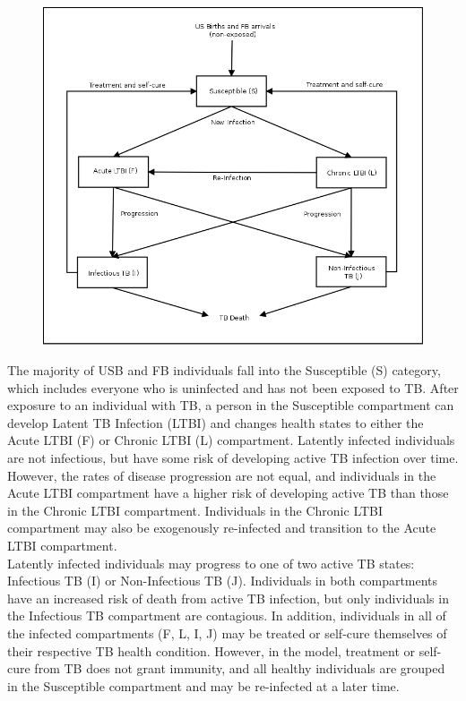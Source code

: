 \documentclass{amsart}
\begin{document}
\begin{figure}
\includegraphics[scale=0.25]{figures/HillModelFlowChart.png}
\end{figure}

The majority of USB and FB individuals fall into the Susceptible (S) category, which includes everyone
who is uninfected and has not been exposed to TB.  After exposure to an individual
with TB, a person in the Susceptible compartment can develop Latent TB Infection (LTBI) and changes
health states to either the Acute LTBI (F) or Chronic LTBI (L) compartment.  Latently
infected individuals are not infectious, but have some risk of developing active TB infection
over time.  However, the rates of disease progression are not equal, and individuals in the
Acute LTBI compartment have a higher risk of developing active TB than those in
the Chronic LTBI compartment.  Individuals in the Chronic LTBI compartment
may also be exogenously re-infected and transition to the Acute LTBI compartment.  \\

Latently infected individuals may progress to one of two active TB states: Infectious TB (I) or 
Non-Infectious TB (J).  Individuals in both compartments have an increased risk of death from
active TB infection, but only individuals in the Infectious TB compartment are contagious.  
In addition, individuals in all of the infected compartments (F, L, I, J) may be treated or self-cure
themselves of their respective TB health condition.  However, in the model, treatment or self-cure from TB
does not grant immunity, and all healthy individuals are grouped in the Susceptible compartment
and may be re-infected at a later time.  \\
\end{document}
